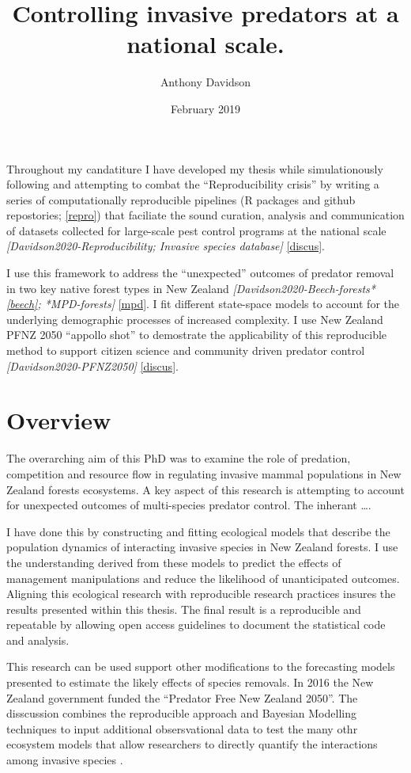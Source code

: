 \documentclass[
]{article}
\title{Controlling invasive predators at a national scale.}
\author{Anthony Davidson}
\date{February 2019}
\begin{document}
\maketitle

{
\setcounter{tocdepth}{2}
\tableofcontents
}
Throughout my candatiture I have developed my thesis while simulationously following and attempting to combat the ``Reproducibility crisis'' \citep{peng2015} by writing a series of computationally reproducible pipelines (R packages and github repostories; \ref{repro}) that faciliate the sound curation, analysis and communication of datasets collected for large-scale pest control programs at the national scale \emph{{[}Davidson2020-Reproducibility; Invasive species database{]}} \ref{discus}.

I use this framework to address the ``unexpected'' outcomes of predator removal in two key native forest types in New Zealand \emph{{[}Davidson2020-Beech-forests* \ref{beech}; *MPD-forests{]}} \ref{mpd}. I fit different state-space models to account for the underlying demographic processes of increased complexity. I use New Zealand PFNZ 2050 ``appollo shot'' to demostrate the applicability of this reproducible method to support citizen science and community driven predator control \emph{{[}Davidson2020-PFNZ2050{]}} \ref{discus}.

\hypertarget{general-over}{%
\section{Overview}\label{general-over}}

The overarching aim of this PhD was to examine the role of predation, competition and resource flow in regulating invasive mammal populations in New Zealand forests ecosystems. A key aspect of this research is attempting to account for unexpected outcomes of multi-species predator control. The inherant \ldots.

I have done this by constructing and fitting ecological models that describe the population dynamics of interacting invasive species in New Zealand forests. I use the understanding derived from these models to predict the effects of management manipulations and reduce the likelihood of unanticipated outcomes. Aligning this ecological research with reproducible research practices insures the results presented within this thesis. The final result is a reproducible and repeatable by allowing open access guidelines to document the statistical code and analysis.

This research can be used support other modifications to the forecasting models presented to estimate the likely effects of species removals. In 2016 the New Zealand government funded the ``Predator Free New Zealand 2050''. The disscussion combines the reproducible approach and Bayesian Modelling techniques to input additional obsersvational data to test the many othr ecosystem models that allow researchers to directly quantify the interactions among invasive species \citep{Peng2015}.
\end{document}
